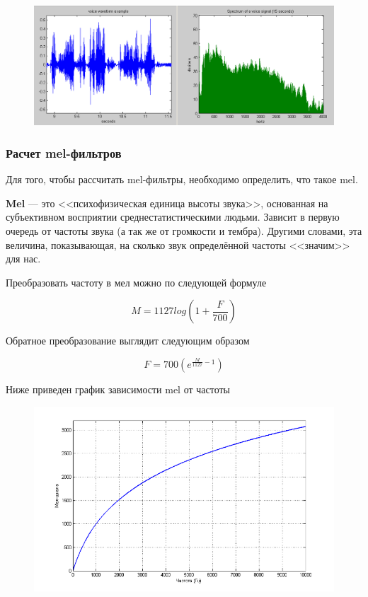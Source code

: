 \documentclass[a4paper,14pt]{extarticle}
\begin{document}
 	\begin{figure}[h!]
 		\begin{center}
 			{\includegraphics[scale = 0.35]{img/wave_to_freq.png}}
 			\label{ris:wave_to_freq}
 		\end{center}
 		\caption{}
 	\end{figure}
 
 	\subsubsection{Расчет mel-фильтров}
 	
 	Для того, чтобы рассчитать mel-фильтры, необходимо определить, что такое mel.
 	
 	{\bf Mel} — это <<психофизическая единица высоты звука>>, основанная на субъективном восприятии среднестатистическими людьми. Зависит в первую очередь от частоты звука (а так же от громкости и тембра). Другими словами, эта величина, показывающая, на сколько звук определённой частоты <<значим>> для нас.
 	
 	Преобразовать частоту в мел можно по следующей формуле
 	
 	\[M = 1127 log(1 + \frac{F}{700})\]
 	
 	Обратное преобразование выглядит следующим образом
 	
 	\[F = 700 (e^{\frac{M}{1127} - 1})\]
 	
 	Ниже приведен график зависимости mel от частоты
 	
 	\begin{figure}[h!]
 		\begin{center}
 			{\includegraphics[scale = 0.35]{img/freq.png}}
 			\label{ris:freq}
 		\end{center}
 		\caption{}
 	\end{figure}
 
\end{document}
